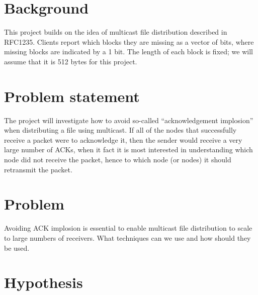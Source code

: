\documentclass[12pt,twoside,english]{article}
\begin{document}
\section{Background}
\label{sect:background}
This project builds on the idea of multicast file distribution described in RFC1235\cite{john_ioannidis_coherent_1991}. Clients report which blocks they are missing as a vector of bits, where missing blocks are indicated by a 1 bit. The length of each block is fixed; we will assume that it is 512 bytes for this project.



\section{Problem statement}
\label{sect:problem_statement}

The project will investigate how to avoid so-called “acknowledgement implosion” when distributing a file using multicast. If all of the nodes that successfully receive a packet were to acknowledge it, then the sender would receive a very large number of \glspl{ACK}, when it fact it is most interested in understanding which node did not receive the packet, hence to which node (or nodes) it should retransmit the packet.

\section{Problem}
\label{sect:problem}


Avoiding \gls{ACK} implosion is essential to enable multicast file distribution to scale to large numbers of receivers. What techniques can we use and how should they be used.

\section{Hypothesis}
\label{sect:hypothesis}
\end{document}
